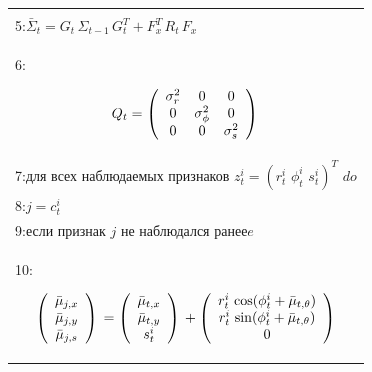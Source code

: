 \documentclass[10pt,a4paper]{article}
\begin{document}
\begin{table}[H]
\begin{center}
\begin{tabular}{|l|}
\begin{minipage}{0.2\textwidth}
\begin{equation*}
\end{equation*}
\end{minipage}\\
5:\hspace{5mm}$\bar{\varSigma}_t=G_t\,\varSigma_{t-1}\,G_t^T+F_x^T\,R_t\,F_x$\\
6:\hspace{5mm}
\begin{minipage}{0.2\textwidth}
\begin{equation*}
Q_t=\left(\begin{array}{ccc} \sigma_r^2&0&0\\
0&\sigma_\phi^2&0\\
0&0&\sigma_s^2\\
\end{array} \right)\\
\end{equation*}
\end{minipage}\\
7:\hspace{5mm}$\textit{для всех наблюдаемых признаков}\,\,z_t^i=(r_t^i\,\,\phi_t^i\,\,s_t^i)^T\,\,\textit{do}$\\
8:\hspace{10mm}$j=c_t^i$\\
9:\hspace{10mm}$\textit{если признак j не наблюдался ранееe}$\\
10:\hspace{15mm}
\begin{minipage}{0.2\textwidth}
\begin{equation*}
\left(\begin{array}{c} \bar{\mu}_{j,x}\\
\bar{\mu}_{j,y}\\
\bar{\mu}_{j,s}\\
\end{array} \right)\\
=\left(\begin{array}{c} \bar{\mu}_{t,x}\\
\bar{\mu}_{t,y}\\
s_t^i\\
\end{array} \right)\\
+\left(\begin{array}{c} r_t^i\,\cos(\phi_t^i+\bar{\mu}_{t,\theta})\\
r_t^i\,\sin(\phi_t^i+\bar{\mu}_{t,\theta})\\
0\\
\end{array} \right)

\end{equation*}
\end{minipage}
\end{tabular}
\end{center}
\end{table}
\end{document}
